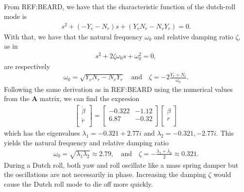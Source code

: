\subsection{}
From REF:BEARD, we have that the characteristic function of the dutch-roll mode is
\begin{equation}\begin{aligned}
s^2 + (-Y_v - N_r)s + (Y_vN_r - N_vY_r) = 0.
\end{aligned}\end{equation}
With that, we have that the natural frequency $\omega_0$ and relative damping ratio $\zeta$, as in
\begin{equation}\begin{aligned}
s^2 + 2\zeta \omega_0 s + \omega_0^2 = 0,
\end{aligned}\end{equation}
are respectively
\begin{equation}\begin{aligned}
\label{eq:freqanddamp}
\omega_0 = \sqrt{Y_v N_r - N_v Y_r} \quad \text{and} \quad \zeta = -2\frac{Y_v + N_r}{\omega_0}.
\end{aligned}\end{equation}
Following the same derivation as in REF:BEARD using the numerical values from the $\mathbf{A}$ matrix, we can find the expresion
\begin{equation}\begin{aligned}
\begin{bmatrix}
\dot \beta\\
\dot r\\
\end{bmatrix}
=
\begin{bmatrix}
-0.322 & -1.12 \\
6.87 & -0.32 \\
\end{bmatrix}
\begin{bmatrix}
\beta\\
r\\
\end{bmatrix}
\end{aligned}\end{equation}
which has the eigenvalues $\lambda_1 = -0.321 + 2.77i$ and $\lambda_2 = -0.321, - 2.77i$. This yields the natural frequency and relative damping ratio
\begin{equation}\begin{aligned}
\omega_0 = \sqrt{\lambda_1 \lambda_2} \approx 2.79, \quad \text{and} \quad \zeta = -\frac{\lambda_1 + \lambda_2}{2} \approx 0.321.
\end{aligned}\end{equation}
During a Dutch roll, both yaw and roll oscillate like a mass spring damper but the oscillations are not necessarily in phase. Increasing the damping $\zeta$ would cause the Dutch roll mode to die off more quickly.

